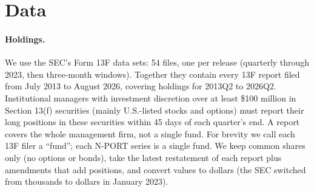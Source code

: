 \section{Data}
\label{sec:data}

\paragraph{Holdings.} We use the SEC's Form 13F data sets: 54 files, one per
release (quarterly through 2023, then three-month windows). Together they
contain every 13F report filed from July 2013 to August 2026, covering
holdings for 2013Q2 to 2026Q2. Institutional managers with investment
discretion over at least \$100 million in Section 13(f) securities (mainly
U.S.-listed stocks and options) must report their long positions in these
securities within 45 days of each quarter's end. A report covers the whole
management firm, not a single fund. For brevity we call each 13F filer a
``fund''; each N-PORT series is a single fund. We keep common shares only (no
options or bonds), take the latest restatement of each report plus amendments
that add positions, and convert values to dollars (the SEC switched from
thousands to dollars in January 2023).

